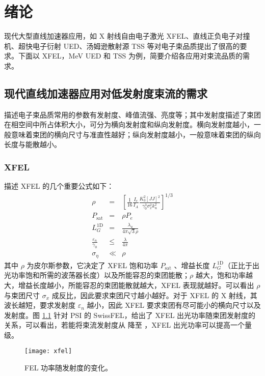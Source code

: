 \chapter{绪论}
\label{chap:intro}

现代大型直线加速器应用，如 X 射线自由电子激光 XFEL、直线正负电子对撞机、超快电子衍射 UED、汤姆逊散射源 TSS 等对电子束品质提出了很高的要求。下面以 XFEL，MeV UED 和 TSS 为例，简要介绍各应用对束流品质的需求。

\section{现代直线加速器应用对低发射度束流的需求}
描述电子束品质常用的参数有发射度、峰值流强、亮度等；其中发射度描述了束团在相空间中所占体积大小，可分为横向发射度和纵向发射度。横向发射度越小，一般意味着束团的横向尺寸与准直性越好；纵向发射度越小，一般意味着束团的纵向长度与能散越小。
\subsection{XFEL}
描述 XFEL 的几个重要公式如下\cite{Huang:2007aa}：
\begin{eqnarray}
\rho &=& \left[\frac{1}{16}\frac{I_e}{I_A}\frac{K_0^2[JJ]^2}{\gamma_0^3\sigma_x^2k_u^2}\right]^{1/3}\\
P_{\text{sat}} &=& \rho P_e\\
L^{\text{1D}}_{G} &=& \frac{\lambda_u}{4\pi\sqrt{3}\rho}\\
\frac{\varepsilon_n}{\gamma_0} &\le& \frac{\lambda}{4\pi}\\
\sigma_{\eta} &\ll& \rho
\end{eqnarray}
其中 $\rho$ 为皮尔斯参数，它决定了 XFEL 饱和功率 $P_{\text{sat}}$ 、增益长度 $L^{\text{1D}}_{G}$（正比于出光功率饱和所需的波荡器长度）以及所能容忍的束团能散；$\rho$ 越大，饱和功率越大，增益长度越小，所能容忍的束团能散就越大，XFEL 表现就越好。可以看出 $\rho$ 与束团尺寸 $\sigma_x$ 成反比，因此要求束团尺寸越小越好。对于 XFEL 的 X 射线，其波长越短，要求发射度 $\varepsilon_n$ 越小，因此 XFEL 要求束团有尽可能小的横向尺寸以及发射度。图 \ref{fig:xfel} 针对 PSI 的 SwissFEL\cite{Patterson:2010aa}，给出了 XFEL 出光功率随束团发射度的关系，可以看出，若能将束流发射度从  降至 ，XFEL 出光功率可以提高一个量级。
\begin{figure}[htbp]
\centering
\texttt{[image: xfel]}
\caption{\label{fig:xfel} FEL 功率随发射度的变化\cite{prat2014emittance}。}
\end{figure}

